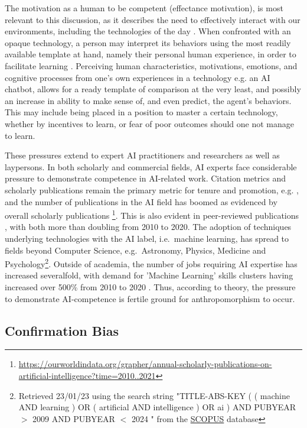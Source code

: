 \documentclass{article}
\theoremstyle{plain}
\theoremstyle{definition}
\theoremstyle{remark}
\begin{document}
The motivation as a human to be competent (effectance motivation), is most relevant to this discussion, as it describes the need to effectively interact with our environments, including the technologies of the day \cite{epley2007seeing}. When confronted with an opaque technology, a person may interpret its behaviors using the most readily available template at hand, namely their personal human experience, in order to facilitate learning \cite{epley2007seeing, waytz2010social}. Perceiving human characteristics, motivations, emotions, and cognitive processes from one's own experiences in a technology e.g. an AI chatbot, allows for a ready template of comparison at the very least, and possibly an increase in ability to make sense of, and even predict, the agent's behaviors. This may include being placed in a position to master a certain technology, whether by incentives to learn, or fear of poor outcomes should one not manage to learn. 

These pressures extend to expert AI practitioners and researchers as well as laypersons. In both scholarly and commercial fields, AI experts face considerable pressure to demonstrate competence in AI-related work. Citation metrics and scholarly publications remain the primary metric for tenure and promotion, e.g. \cite{alperin2019significant}, and the number of publications in the AI field has boomed as evidenced by overall scholarly publications \footnote{\url{https://ourworldindata.org/grapher/annual-scholarly-publications-on-artificial-intelligence?time=2010..2021} }. This is also evident in peer-reviewed publications \cite{Maslej2023-pi}, with both more than doubling from 2010 to 2020. The adoption of techniques underlying technologies with the AI label, i.e.\ machine learning, has spread to fields beyond Computer Science, e.g.\ Astronomy, Physics, Medicine and Psychology\footnote{Retrieved 23/01/23 using the search string "TITLE-ABS-KEY ( ( machine  AND  learning )  OR  ( artificial  AND  intelligence )  OR  ai )  AND  PUBYEAR  $>$  2009  AND  PUBYEAR  $<$  2024 " from the \href{https://www.scopus.com/}{SCOPUS} database}. Outside of academia, the number of jobs requiring AI expertise has increased severalfold, with demand for 'Machine Learning' skills clusters having increased over 500\% from 2010 to 2020 \cite{Maslej2023-pi}. Thus, according to theory, the pressure to demonstrate AI-competence is fertile ground for anthropomorphism to occur. 


\subsection{Confirmation Bias}
\end{document}
